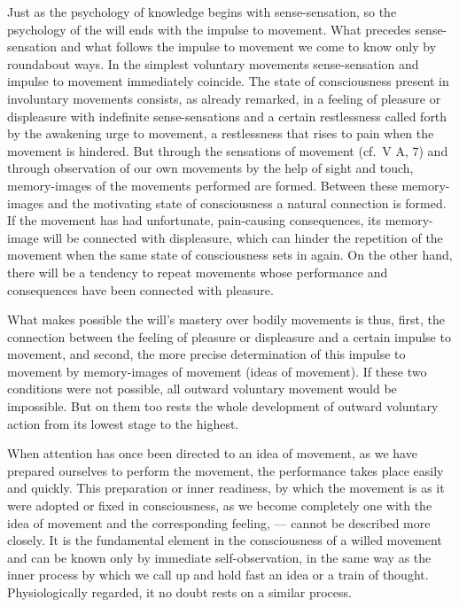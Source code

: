 \documentclass[12pt,a4paper]{book}
\newcommand{\opage}[1]{\marginnote{\footnotesize\textit{[#1]}}}
\begin{document}
Just as the psychology of knowledge begins with sense-sensation, so the
psychology of the will ends with the impulse to movement. What precedes
sense-sensation and what follows the impulse to movement we come to know
only by roundabout ways. In the simplest voluntary movements
sense-sensation and impulse to movement immediately coincide. The state
of consciousness present in involuntary movements consists, as already
remarked, in a feeling of pleasure or displeasure with indefinite
sense-sensations and a certain restlessness called forth by the awakening
urge to movement, a restlessness that rises to pain when the movement is
hindered. But through the sensations of movement (cf.\ V A, 7) and
through observation of our own movements by the help of sight and touch,
memory-images of the movements performed are formed. Between these
\opage{376}memory-images and the motivating state of consciousness a
natural connection is formed. If the movement has had unfortunate,
pain-causing consequences, its memory-image will be connected with
displeasure, which can hinder the repetition of the movement when the
same state of consciousness sets in again. On the other hand, there will
be a tendency to repeat movements whose performance and consequences have
been connected with pleasure.

What makes possible the will's mastery over bodily movements is thus,
first, the connection between the feeling of pleasure or displeasure and
a certain impulse to movement, and second, the more precise determination
of this impulse to movement by memory-images of movement (ideas of
movement). If these two conditions were not possible, all outward
voluntary movement would be impossible. But on them too rests the whole
development of outward voluntary action from its lowest stage to the
highest.

When attention has once been directed to an idea of movement, as we have
prepared ourselves to perform the movement, the performance takes place
easily and quickly. This preparation or inner readiness, by which the
movement is as it were adopted or fixed in consciousness, as we become
completely one with the idea of movement and the corresponding feeling,
--- cannot be described more closely. It is the fundamental element in
the consciousness of a willed movement and can be known only by immediate
self-observation, in the same way as the inner process by which we call
up and hold fast an idea or a train of thought. Physiologically regarded,
it no doubt rests on a similar process.
\end{document}
